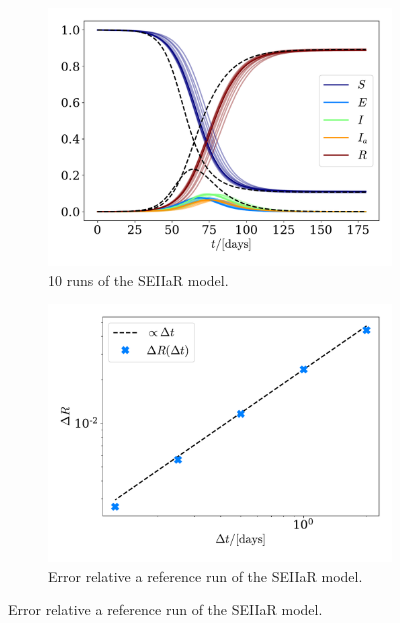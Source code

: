 \documentclass{article}
\begin{document}
    \begin{figure}[H]
        \centering
        \begin{subfigure}{.49\textwidth}
            \includegraphics[width=\textwidth]{../plots/2C/TestSEIIaR.pdf}
            \caption{10 runs of the SEIIaR model.}
            \label{SEIIaR}
        \end{subfigure}
        \begin{subfigure}{.49\textwidth}
            \includegraphics[width=\textwidth]{../plots/2C/conv.pdf}
            \caption{Error relative a reference run of the SEIIaR model.}
            \label{SEIIaR conv}
        \end{subfigure}
    \end{figure}
\end{document}
